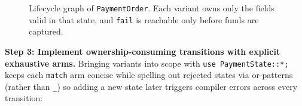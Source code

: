 \begin{figure}[H]
\caption{Lifecycle graph of \texttt{PaymentOrder}. Each variant owns only the fields valid in that state, and \texttt{fail} is reachable only before funds are captured.}
\label{ch05:fig-payment-state-machine}
\end{figure}

\textbf{Step 3: Implement ownership-consuming transitions with explicit exhaustive arms.} Bringing variants into scope with \texttt{use PaymentState::*;} keeps each \texttt{match} arm concise while spelling out rejected states via or-patterns (rather than \texttt{\_}) so adding a new state later triggers compiler errors across every transition:

